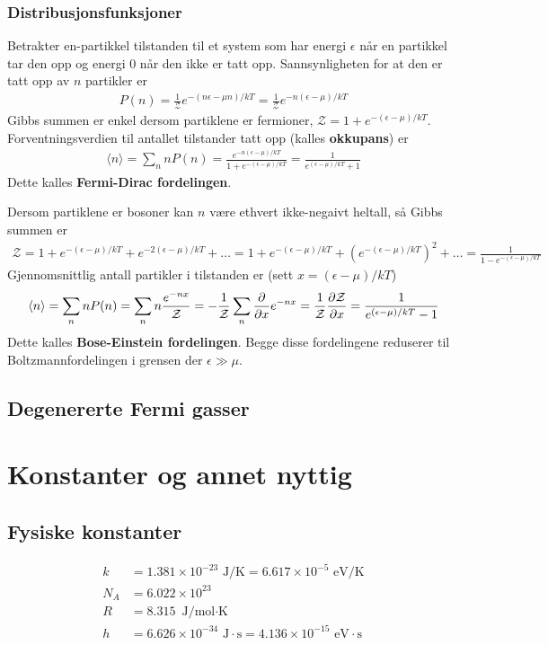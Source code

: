 \documentclass[12pt]{article}
\newcommand{\mean}[1]{\langle #1 \rangle}
\begin{document}
\subsubsection{Distribusjonsfunksjoner}
Betrakter en-partikkel tilstanden til et system som har energi $\epsilon$ når
en partikkel tar den opp og energi $0$ når den ikke er tatt opp. Sannsynligheten
for at den er tatt opp av $n$ partikler er
\begin{align*}
  P(n) = \frac{1}{\mathcal{Z}} e^{-(n\epsilon - \mu n)/kT} = \frac{1}{\mathcal{Z}} e^{-n(\epsilon - \mu)/kT}
\end{align*}
Gibbs summen er enkel dersom partiklene er fermioner, $\mathcal{Z} = 1 + e^{-(\epsilon - \mu)/kT}$.
Forventningsverdien til antallet tilstander tatt opp (kalles \textbf{okkupans}) er
\begin{align*}
  \mean{n} = \sum_n n P(n) = \frac{e^{-n(\epsilon - \mu)/kT}}{1 + e^{-(\epsilon - \mu)/kT}} = \frac{1}{e^{(\epsilon - \mu)/kT} + 1}
\end{align*}
Dette kalles \textbf{Fermi-Dirac fordelingen}.

Dersom partiklene er bosoner kan $n$ være ethvert ikke-negaivt heltall, så Gibbs summen er
\begin{align*}
  \mathcal{Z} = 1 + e^{-(\epsilon - \mu)/kT} + e^{-2(\epsilon - \mu)/kT} + \hdots = 1 + e^{-(\epsilon - \mu)/kT} + (e^{-(\epsilon - \mu)/kT})^2 + \hdots = \frac{1}{1-e^{-(\epsilon - \mu)/kT}}
\end{align*}
Gjennomsnittlig antall partikler i tilstanden er (sett $x = (\epsilon - \mu)/kT$)
\begin{align*}
  \mean{n} = \sum_n n P(n) = \sum_n n \frac{e^{-nx}}{\mathcal{Z}} = - \frac{1}{\mathcal{Z}} \sum_n \pdv{x} e^{-nx} = \frac{1}{\mathcal{Z}} \pdv{\mathcal{Z}}{x} = \frac{1}{e^{(\epsilon - \mu)/kT} - 1}
\end{align*}
Dette kalles \textbf{Bose-Einstein fordelingen}. Begge disse fordelingene reduserer til Boltzmannfordelingen
i grensen der $\epsilon \gg \mu$.
\subsection{Degenererte Fermi gasser}

\section{Konstanter og annet nyttig}
\subsection{Fysiske konstanter}
\begin{align*}
  k   &= 1.381 \times 10^{-23} \text{ J/K} = 6.617 \times 10^{-5} \text{ eV/K} \\
  N_A &= 6.022 \times 10^{23}        \\
  R   &= 8.315 \text{ J/mol$\cdot$K} \\
  h   &= 6.626 \times 10^{-34} \text{ J}\cdot\text{s} = 4.136 \times 10^{-15} \text{ eV}\cdot\text{s}\\
\end{align*}
\end{document}
